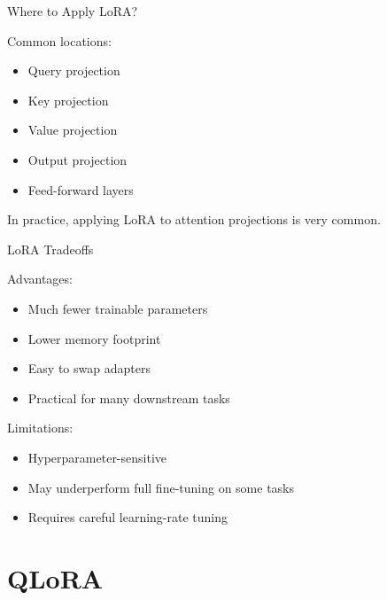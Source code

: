 \documentclass[aspectratio=169]{beamer}
\begin{document}
\begin{frame}{Where to Apply LoRA?}

Common locations:

\begin{itemize}
    \item Query projection
    \item Key projection
    \item Value projection
    \item Output projection
    \item Feed-forward layers
\end{itemize}

\vspace{0.5cm}

In practice, applying LoRA to attention projections is very common.

\end{frame}

\begin{frame}{LoRA Tradeoffs}

Advantages:

\begin{itemize}
    \item Much fewer trainable parameters
    \item Lower memory footprint
    \item Easy to swap adapters
    \item Practical for many downstream tasks
\end{itemize}

\vspace{0.4cm}

Limitations:

\begin{itemize}
    \item Hyperparameter-sensitive
    \item May underperform full fine-tuning on some tasks
    \item Requires careful learning-rate tuning
\end{itemize}

\end{frame}

\section{QLoRA}
\end{document}
